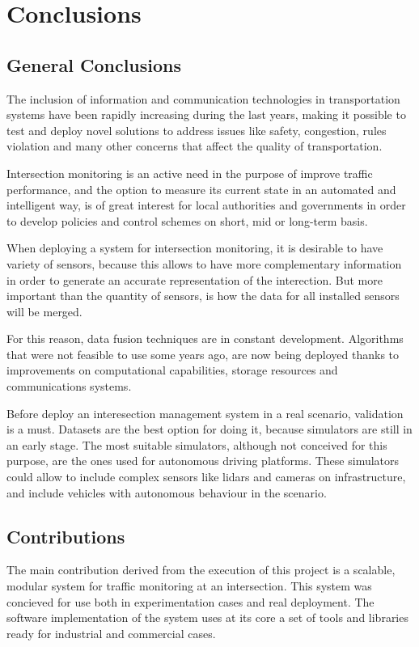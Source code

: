 \chapter {Conclusions}

\section{General Conclusions}

The inclusion of information and communication technologies in transportation systems have been rapidly increasing during the last years, making it possible to test and deploy novel solutions to address issues like safety, congestion, rules violation and many other concerns that affect the quality of transportation.

Intersection monitoring is an active need in the purpose of improve traffic performance, and the option to measure its current state in an automated and intelligent way, is of great interest for local authorities and governments in order to develop policies and control schemes on short, mid or long-term basis.

When deploying a system for intersection monitoring, it is desirable to have variety of sensors, because this allows to have more complementary information in order to generate an accurate representation of the interection. But more important than the quantity of sensors, is how the data for all installed sensors will be merged.

For this reason, data fusion techniques are in constant development. Algorithms that were not feasible to use some years ago, are now being deployed thanks to improvements on computational capabilities, storage resources and communications systems.

Before deploy an interesection management system in a real scenario, validation is a must. Datasets are the best option for doing it, because simulators are still in an early stage. The most suitable simulators, although not conceived for this purpose, are the ones used for autonomous driving platforms. These simulators could allow to include complex sensors like lidars and cameras on infrastructure, and include vehicles with autonomous behaviour in the scenario.


\section{Contributions}

The main contribution derived from the execution of this project is a scalable, modular system for traffic monitoring at an intersection. This system was concieved for use both in experimentation cases and real deployment. The software implementation of the system uses at its core a set of tools and libraries ready for industrial and commercial cases.

